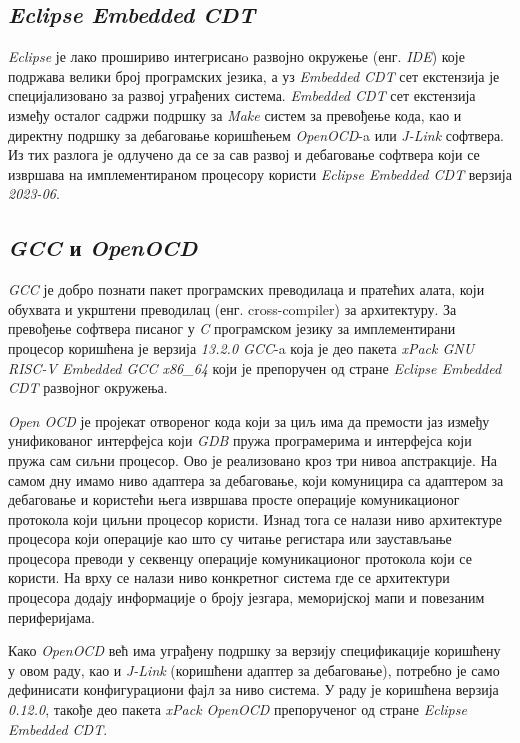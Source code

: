 \subsection{\textit{Eclipse Embedded CDT}}

\textit{Eclipse} је лако прошириво интегрисанo развојно окружење (енг. \textit{\acrfull{IDE}}) које подржава велики број програмских језика, а уз \textit{Embedded \acrfull{CDT}}\cite{embcdt} сет екстензија је специјализовано за развој уграђених система. \textit{Embedded \acrshort{CDT}} сет екстензија између осталог садржи подршку за \textit{Make} систем за превођење кода, као и директну подршку за дебаговање коришћењем \textit{OpenOCD}-a или \textit{J-Link} софтвера.
Из тих разлога је одлучено да се за сав развој и дебаговање софтвера који се извршава на имплементираном процесору користи \textit{Eclipse Embedded CDT} верзија \textit{2023-06}.

\subsection{\textit{GCC} и \textit{OpenOCD}}

\textit{\acrfull{GCC}}\cite{gcc} је добро познати пакет програмских преводилаца и пратећих алата, који обухвата и укрштени преводилац (енг. cross-compiler) за  архитектуру.
За превођење софтвера писаног у \textit{C} програмском језику за имплементирани процесор коришћена је верзија \textit{13.2.0 \acrshort{GCC}}-a која је део пакета \textit{xPack GNU RISC-V Embedded GCC x86\_64} који је препоручен од стране \textit{Eclipse Embedded CDT} развојног окружења.

\textit{Open \acrfull{OCD}}\cite{openocd} је пројекат отвореног кода који за циљ има да премости јаз између унификованог интерфејса који \textit{\acrfull{GDB}} пружа програмерима и интерфејса који пружа сам сиљни процесор.
Ово је реализовано кроз три нивоа апстракције. На самом дну имамо ниво адаптера за дебаговање, који комуницира са адаптером за дебаговање и користећи њега извршава просте операције комуникационог протокола који циљни процесор користи. Изнад тога се налази ниво архитектуре процесора који операције као што су читање регистара или заустављање процесора преводи у секвенцу операције комуникационог протокола који се користи. На врху се налази ниво конкретног система где се архитектури процесора додају информације о броју језгара, меморијској мапи и повезаним периферијама.

Како \textit{Open\acrshort{OCD}} већ има уграђену подршку за верзију спецификације\cite{debug_spec} коришћену у овом раду, као и \textit{J-Link} (коришћени адаптер за дебаговање), потребно је само дефинисати конфигурациони фајл за ниво система. У раду је коришћена верзија \textit{0.12.0}, такође део пакета \textit{xPack OpenOCD} препорученог од стране \textit{Eclipse Embedded CDT}.

